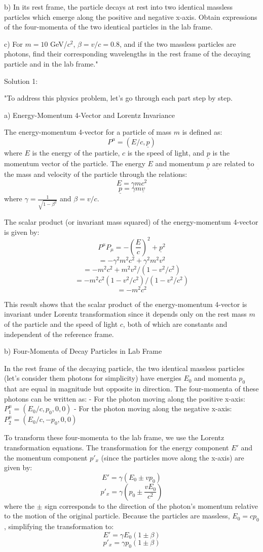 b) In its rest frame, the particle decays at rest into two identical massless particles which emerge along the positive and negative x-axis. Obtain expressions of the four-momenta of the two identical particles in the lab frame. 
    
c) For \( m = 10 \) GeV/\( c^{2} \), \( \beta = v/c = 0.8 \), and if the two massless particles are photons, find their corresponding wavelengths in the rest frame of the decaying particle and in the lab frame."

Solution 1:

"To address this physics problem, let's go through each part step by step.

a) Energy-Momentum 4-Vector and Lorentz Invariance

The energy-momentum 4-vector for a particle of mass $m$ is defined as:
\[ P^\mu = (E/c, \underline{p}) \]
where $E$ is the energy of the particle, $c$ is the speed of light, and $\underline{p}$ is the momentum vector of the particle. The energy $E$ and momentum $\underline{p}$ are related to the mass and velocity of the particle through the relations:
\[ E = \gamma mc^2 \]
\[ \underline{p} = \gamma m \underline{v} \]
where $\gamma = \frac{1}{\sqrt{1 - \beta^2}}$ and $\beta = v/c$.

The scalar product (or invariant mass squared) of the energy-momentum 4-vector is given by:
\[ P^\mu P_\mu = -\left(\frac{E}{c}\right)^2 + \underline{p}^2 \]
\[ = -\gamma^2 m^2 c^2 + \gamma^2 m^2 v^2 \]
\[ = -m^2 c^2 + m^2 v^2 / (1 - v^2/c^2) \]
\[ = -m^2 c^2 (1 - v^2/c^2) / (1 - v^2/c^2) \]
\[ = -m^2 c^2 \]

This result shows that the scalar product of the energy-momentum 4-vector is invariant under Lorentz transformation since it depends only on the rest mass $m$ of the particle and the speed of light $c$, both of which are constants and independent of the reference frame.

b) Four-Momenta of Decay Particles in Lab Frame

In the rest frame of the decaying particle, the two identical massless particles (let's consider them photons for simplicity) have energies $E_0$ and momenta $p_0$ that are equal in magnitude but opposite in direction. The four-momenta of these photons can be written as:
- For the photon moving along the positive x-axis: $P_1^\mu = (E_0/c, p_0, 0, 0)$
- For the photon moving along the negative x-axis: $P_2^\mu = (E_0/c, -p_0, 0, 0)$

To transform these four-momenta to the lab frame, we use the Lorentz transformation equations. The transformation for the energy component $E'$ and the momentum component $p'_x$ (since the particles move along the x-axis) are given by:
\[ E' = \gamma (E_0 \pm vp_0) \]
\[ p'_x = \gamma (p_0 \pm \frac{vE_0}{c^2}) \]
where the $\pm$ sign corresponds to the direction of the photon's momentum relative to the motion of the original particle. Because the particles are massless, $E_0 = cp_0$, simplifying the transformation to:
\[ E' = \gamma E_0 (1 \pm \beta) \]
\[ p'_x = \gamma p_0 (1 \pm \beta) \]

